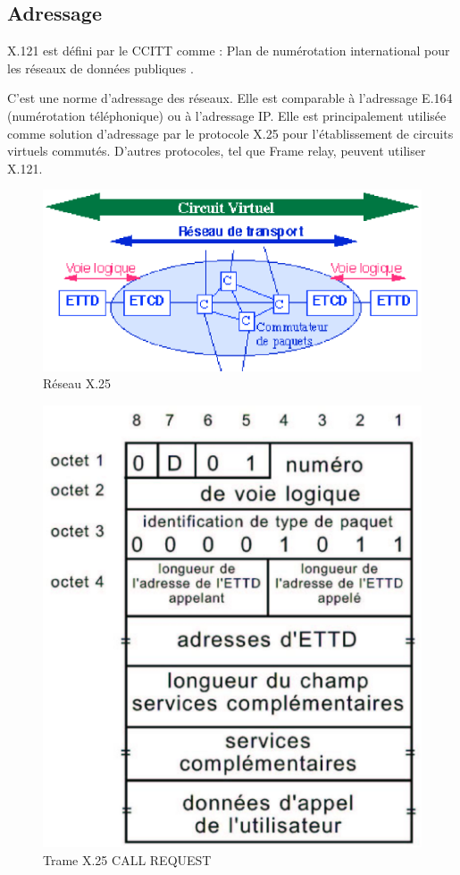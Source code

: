 \documentclass[12pt]{report}
\begin{document}
\subsection{Adressage}
X.121 est défini par le CCITT comme : \og Plan de numérotation international pour les réseaux de données publiques \fg.

C'est une norme d'adressage des réseaux. Elle est comparable à l'adressage E.164 (numérotation téléphonique) ou à l'adressage IP. Elle est principalement utilisée comme solution d'adressage par le protocole X.25 pour l'établissement de circuits virtuels commutés. D'autres protocoles, tel que Frame relay, peuvent utiliser X.121\cite{wikix121}.

\begin{figure}[htp]
  \centering
  \includegraphics[scale=0.8]{images/network}
  \caption{Réseau X.25}
  \label{fig:net}
\end{figure}

\begin{figure}[htp]
  \centering
  \includegraphics[scale=0.3]{images/x25}
  \caption{Trame X.25 \og CALL REQUEST \fg}
  \label{fig:x25}
\end{figure}
\end{document}
